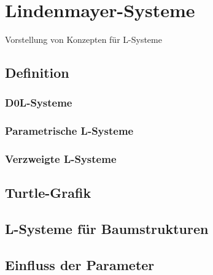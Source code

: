 \chapter{Lindenmayer-Systeme}

Vorstellung von Konzepten für L-Systeme

\section{Definition}

\subsection{D0L-Systeme}
\subsection{Parametrische L-Systeme}
\subsection{Verzweigte L-Systeme}

\section{Turtle-Grafik}

\section{L-Systeme für Baumstrukturen}

\section{Einfluss der Parameter}